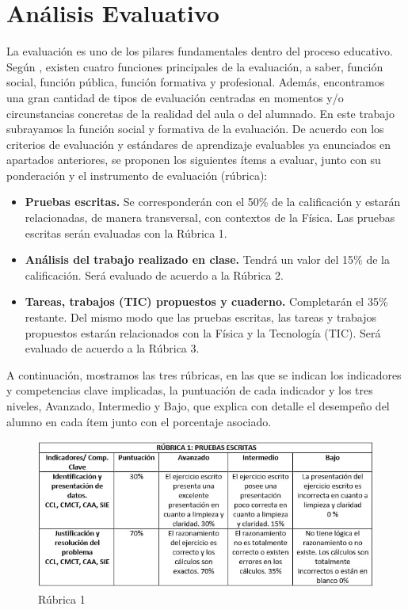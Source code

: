 \documentclass[../main.tex]{memoir}
\begin{document}
\section{Análisis Evaluativo}

La evaluación es uno de los pilares fundamentales dentro del proceso educativo. Según \cite{rico2013}, existen cuatro funciones principales de la evaluación, a saber, función social, función pública, función formativa y profesional. Además, encontramos una gran cantidad de tipos de evaluación centradas en momentos y/o circunstancias concretas de la realidad del aula o del alumnado. En este trabajo subrayamos la función social y formativa de la evaluación. De acuerdo con los criterios de evaluación y estándares de aprendizaje evaluables ya enunciados en apartados anteriores, se proponen los siguientes ítems a evaluar, junto con su ponderación y el instrumento de evaluación (rúbrica):

\begin{itemize}
	\item \textbf{Pruebas escritas.} Se corresponderán con el 50\% de la calificación y estarán relacionadas, de manera transversal, con contextos de la Física. Las pruebas escritas serán evaluadas con la Rúbrica 1.
	\item \textbf{Análisis del trabajo realizado en clase.} Tendrá un valor del 15\% de la calificación. Será evaluado de acuerdo a la Rúbrica 2.
	\item \textbf{Tareas, trabajos (TIC) propuestos y cuaderno.} Completarán el 35\% restante. Del mismo modo que las pruebas escritas, las tareas y trabajos propuestos estarán relacionados con la Física y la Tecnología (TIC).  Será evaluado de acuerdo a la Rúbrica 3.
\end{itemize}

A continuación, mostramos las tres rúbricas, en las que se indican los indicadores y competencias clave implicadas, la puntuación de cada indicador y los tres niveles, Avanzado, Intermedio y Bajo, que explica con detalle el desempeño del alumno en cada ítem junto con el porcentaje asociado.

\begin{figure}[H]
	\centering
	\includegraphics[scale=0.8]{images/rub1.jpeg}
	\caption{Rúbrica 1}
	\label{rubrica1}
\end{figure}
\end{document}
